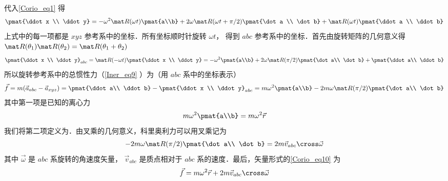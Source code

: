  代入\autoref{Corio_eq1} 得
\begin{equation}
\pmat{\ddot x \\ \ddot y} =
- \omega ^2 \mat R(\omega t)\pmat{a\\b} + 2\omega \mat R(\omega t + \pi /2)\pmat{\dot a \\ \dot b} + \mat R(\omega t)\pmat{\ddot a \\ \ddot b}
\end{equation}
上式中的每一项都是 $xyz$ 参考系中的坐标．所有坐标顺时针旋转 $\omega t$， 得到 $abc$ 参考系中的坐标．首先由旋转矩阵的几何意义得 $\mat R(\theta_1)\mat R(\theta_2) = \mat R(\theta_1 + \theta_2)$
\begin{equation}
\pmat{\ddot x \\ \ddot y}_{abc} =
\mat R(-\omega t ) \pmat{\ddot x \\ \ddot y} =
- \omega^2 \pmat{a\\b} + 2\omega \mat R(\pi /2)\pmat{\dot a\\ \dot b} + \pmat{\ddot a\\ \ddot b}
\end{equation}
所以旋转参考系中的总惯性力（\autoref{Iner_eq9} ）为（用 $abc$ 系中的坐标表示）
\begin{equation}\label{Corio_eq10}
\vec f = m(\vec a_{abc} - \vec a_{xyz})
= \pmat{\ddot a\\ \ddot b} - \pmat{\ddot x \\ \ddot y}_{abc} = m \omega ^2 \pmat{a\\b} - 2m\omega \mat R(\pi /2)\pmat{\dot a\\ \dot b}
\end{equation}
其中第一项是已知的离心力
\begin{equation}
m \omega ^2 \pmat{a\\b} = m \omega ^2 \vec r
\end{equation}
我们将第二项定义为．由叉乘的几何意义，科里奥利力可以用叉乘记为
\begin{equation}
- 2m\omega \mat R(\pi /2)\pmat{\dot a\\ \dot b} = 2m \vec v_{abc} \cross \vec \omega
\end{equation}
其中 $\vec\omega$ 是 $abc$ 系旋转的角速度矢量， $\vec v_{abc}$ 是质点相对于 $abc$ 系的速度．最后，矢量形式的\autoref{Corio_eq10} 为
\begin{equation}
\vec f = m \omega ^2 \vec r + 2m \vec v_{abc} \cross \vec \omega 
\end{equation}
 




